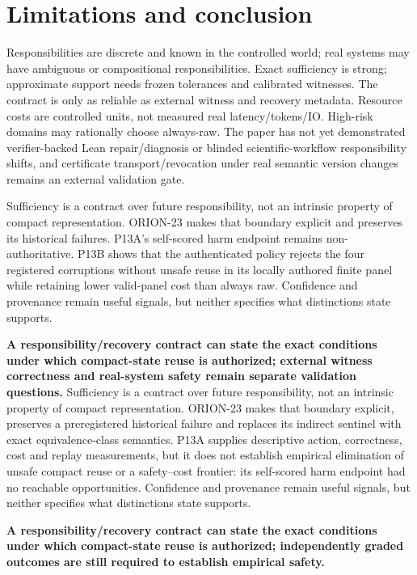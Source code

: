 \section{Limitations and conclusion}\label{limitations-and-conclusion}

Responsibilities are discrete and known in the controlled world; real
systems may have ambiguous or compositional responsibilities. Exact
sufficiency is strong; approximate support needs frozen tolerances and
calibrated witnesses. The contract is only as reliable as external
witness and recovery metadata. Resource costs are controlled units, not
measured real latency/tokens/IO. High-risk domains may rationally choose
always-raw. The paper has not yet demonstrated verifier-backed Lean
repair/diagnosis or blinded scientific-workflow responsibility shifts,
and certificate transport/revocation under real semantic version changes
remains an external validation gate.

Sufficiency is a contract over future responsibility, not an intrinsic
property of compact representation. ORION-23 makes that boundary
explicit and preserves its historical failures. P13A's self-scored harm
endpoint remains non-authoritative. P13B shows that the authenticated
policy rejects the four registered corruptions without unsafe reuse in
its locally authored finite panel while retaining lower valid-panel cost
than always raw. Confidence and provenance remain useful signals, but
neither specifies what distinctions state supports.

\textbf{A responsibility/recovery contract can state the exact
conditions under which compact-state reuse is authorized; external
witness correctness and real-system safety remain separate validation
questions.} Sufficiency is a contract over future responsibility, not an
intrinsic property of compact representation. ORION-23 makes that
boundary explicit, preserves a preregistered historical failure and
replaces its indirect sentinel with exact equivalence-class semantics.
P13A supplies descriptive action, correctness, cost and replay
measurements, but it does not establish empirical elimination of unsafe
compact reuse or a safety--cost frontier: its self-scored harm endpoint
had no reachable opportunities. Confidence and provenance remain useful
signals, but neither specifies what distinctions state supports.

\textbf{A responsibility/recovery contract can state the exact
conditions under which compact-state reuse is authorized; independently
graded outcomes are still required to establish empirical safety.}
